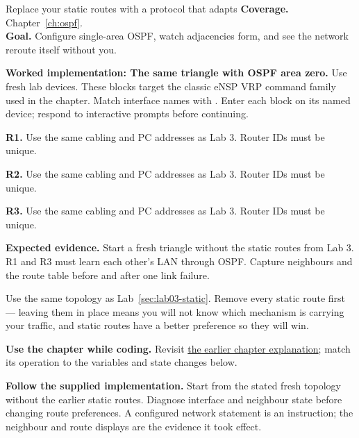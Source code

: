 
\begin{labproject}{Replace your static routes with a protocol that adapts}
\textbf{Coverage.} Chapter~\ref{ch:ospf}.\\
\textbf{Goal.} Configure single-area OSPF, watch adjacencies form, and see the network reroute itself without you.



\noindent\textbf{Worked implementation: The same triangle with OSPF area zero.}
Use fresh lab devices. These blocks target the classic eNSP VRP command family used in the chapter. Match interface names with . Enter each block on its named device; respond to interactive prompts before continuing.

\noindent\textbf{R1.} Use the same cabling and PC addresses as Lab 3. Router IDs must be unique.


\noindent\textbf{R2.} Use the same cabling and PC addresses as Lab 3. Router IDs must be unique.


\noindent\textbf{R3.} Use the same cabling and PC addresses as Lab 3. Router IDs must be unique.


\textbf{Expected evidence.} Start a fresh triangle without the static routes from Lab 3. R1 and R3 must learn each other's LAN through OSPF. Capture neighbours and the route table before and after one link failure.




\begin{labmode}
Use the same topology as Lab~\ref{sec:lab03-static}. Remove every static route first --- leaving them in place means you will not know which mechanism is carrying your traffic, and static routes have a better preference so they will win.




\textbf{Use the chapter while coding.} Revisit \hyperref[ch:ospf]{the earlier chapter explanation}; match its operation to the variables and state changes below.

\textbf{Follow the supplied implementation.} Start from the stated fresh topology without the earlier static routes. Diagnose interface and neighbour state before changing route preferences. A configured network statement is an instruction; the neighbour and route displays are the evidence it took effect.



\end{labmode}
\end{labproject}
